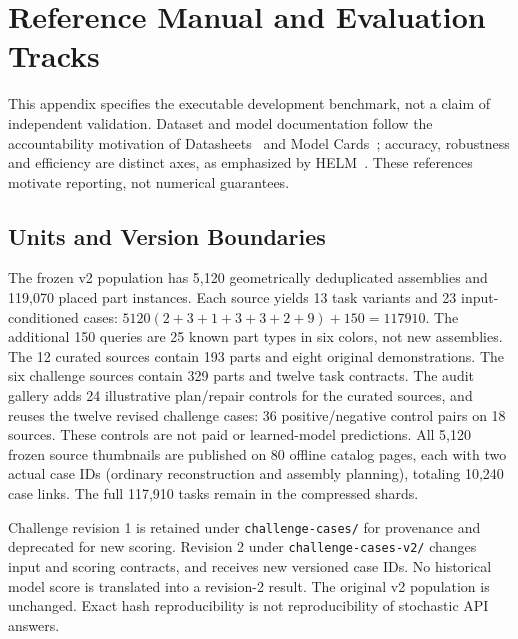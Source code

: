 \clearpage
\onecolumn
\section{Reference Manual and Evaluation Tracks}
\label{sec:manual}
This appendix specifies the executable development benchmark, not a claim of independent
validation. Dataset and model documentation follow the accountability motivation of
Datasheets~\cite{gebru2021datasheets} and Model Cards~\cite{mitchell2019modelcards};
accuracy, robustness and efficiency are distinct axes, as emphasized by
HELM~\cite{liang2023helm}. These references motivate reporting, not numerical guarantees.

\subsection{Units and Version Boundaries}
The frozen v2 population has 5,120 geometrically deduplicated assemblies and 119,070
placed part instances. Each source yields 13 task variants and 23 input-conditioned
cases: $5120(2+3+1+3+3+2+9)+150=117910$.
The additional 150 queries are 25 known part types in six colors, not new assemblies.
The 12 curated sources contain 193 parts and eight original demonstrations.
The six challenge sources contain 329 parts and twelve task contracts.
The audit gallery adds 24 illustrative plan/repair controls for the curated sources,
and reuses the twelve revised challenge cases: 36 positive/negative control pairs on
18 sources. These controls are not paid or learned-model predictions.
All 5,120 frozen source thumbnails are published on 80 offline catalog pages, each
with two actual case IDs (ordinary reconstruction and assembly planning), totaling
10,240 case links. The full 117,910 tasks remain in the compressed shards.

Challenge revision 1 is retained under \texttt{challenge-cases/} for provenance and
deprecated for new scoring. Revision 2 under \texttt{challenge-cases-v2/} changes
input and scoring contracts, and receives new versioned case IDs. No historical
model score is translated into a revision-2 result. The original v2 population is
unchanged. Exact hash reproducibility is not reproducibility of stochastic API answers.


